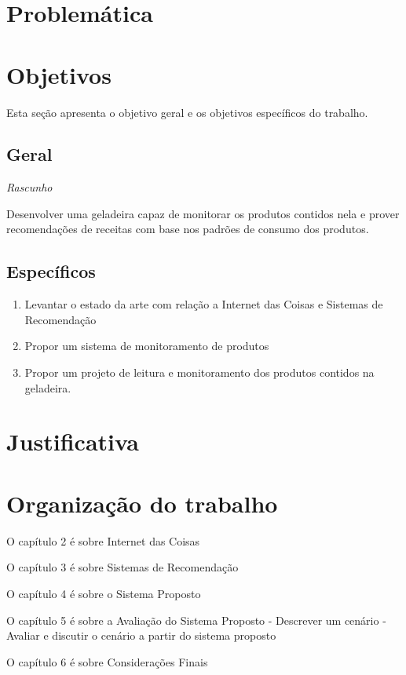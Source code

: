 \section{Problemática}


\section{Objetivos}
Esta seção apresenta o objetivo geral e os objetivos específicos do trabalho.

\subsection{Geral}

\textit{Rascunho}

Desenvolver uma geladeira capaz de monitorar os produtos contidos nela e prover recomendações de receitas com base nos padrões de consumo dos produtos.


\subsection{Específicos}
\begin{enumerate}
	\item Levantar o estado da arte com relação a Internet das Coisas e Sistemas de Recomendação
	\item Propor um sistema de monitoramento de produtos 
	\item Propor um projeto de leitura e monitoramento dos produtos contidos na geladeira.
\end{enumerate}

\section{Justificativa}


\section{Organização do trabalho}

O capítulo 2 é sobre Internet das Coisas

O capítulo 3 é sobre Sistemas de Recomendação

O capítulo 4 é sobre o Sistema Proposto

O capítulo 5 é sobre a Avaliação do Sistema Proposto
	- Descrever um cenário
	- Avaliar e discutir o cenário a partir do sistema proposto
	
O capítulo 6 é sobre Considerações Finais




